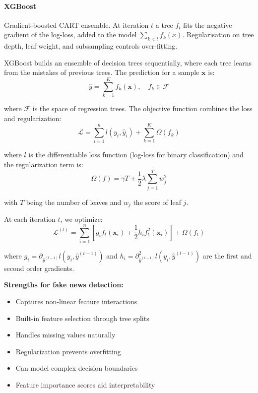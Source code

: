 \documentclass[11pt]{article}
\begin{document}
\paragraph{XGBoost}
Gradient-boosted CART ensemble.
At iteration $t$ a tree $f_t$ fits the negative gradient of the log-loss,
added to the model
$\sum_{k<t} f_k(x)$.  Regularisation on tree depth, leaf weight, and
subsampling controls over-fitting.

XGBoost builds an ensemble of decision trees sequentially, where each tree learns from the mistakes of previous trees. The prediction for a sample $\mathbf{x}$ is:
\begin{equation}
\hat{y} = \sum_{k=1}^{K} f_k(\mathbf{x}), \quad f_k \in \mathcal{F}
\end{equation}

where $\mathcal{F}$ is the space of regression trees. The objective function combines the loss and regularization:
\begin{equation}
\mathcal{L} = \sum_{i=1}^{n} l(y_i, \hat{y}_i) + \sum_{k=1}^{K} \Omega(f_k)
\end{equation}

where $l$ is the differentiable loss function (log-loss for binary classification) and the regularization term is:
\begin{equation}
\Omega(f) = \gamma T + \frac{1}{2}\lambda \sum_{j=1}^{T} w_j^2
\end{equation}

with $T$ being the number of leaves and $w_j$ the score of leaf $j$.

At each iteration $t$, we optimize:
\begin{equation}
\mathcal{L}^{(t)} = \sum_{i=1}^{n} \left[g_i f_t(\mathbf{x}_i) + \frac{1}{2}h_i f_t^2(\mathbf{x}_i)\right] + \Omega(f_t)
\end{equation}

where $g_i = \partial_{\hat{y}^{(t-1)}} l(y_i, \hat{y}^{(t-1)})$ and $h_i = \partial^2_{\hat{y}^{(t-1)}} l(y_i, \hat{y}^{(t-1)})$ are the first and second order gradients.

\textbf{Strengths for fake news detection:}
\begin{itemize}
\item Captures non-linear feature interactions
\item Built-in feature selection through tree splits
\item Handles missing values naturally
\item Regularization prevents overfitting
\item Can model complex decision boundaries
\item Feature importance scores aid interpretability
\end{itemize}
\end{document}
